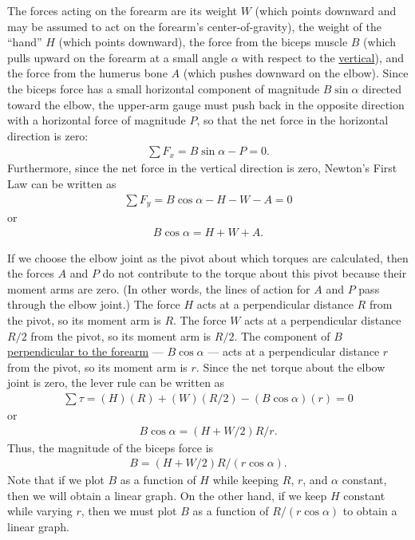 The forces acting on the forearm are its weight \(W\) (which points downward and may be assumed to act on the forearm's center-of-gravity), the weight of the ``hand'' \(H\) (which points downward), the force from the biceps muscle \(B\) (which pulls upward on the forearm at a small angle \(\alpha\) with respect to the \ul{vertical}), and the force from the humerus bone \(A\) (which pushes downward on the elbow).  Since the biceps force has a small horizontal component of magnitude \(B\sin\alpha\) directed toward the elbow, the upper-arm gauge must push back in the opposite direction with a horizontal force of magnitude \(P\), so that the net force in the horizontal direction is zero:
\begin{align} \sum F_x = B \sin \alpha - P = 0.  \end{align}
Furthermore, since the net force in the vertical direction is zero, Newton's First Law can be written as
\begin{align} \sum F_y = B\cos\alpha - H - W - A = 0 \end{align}
or
\begin{align} B\cos\alpha = H + W + A. \label{6Aexp6_eqn_1} \end{align}

If we choose the elbow joint as the pivot about which torques are calculated, then the forces \(A\) and \(P\) do not contribute to the torque about this pivot because their moment arms are zero.  (In other words, the lines of action for \(A\) and \(P\) pass through the elbow joint.)  The force \(H\) acts at a perpendicular distance \(R\) from the pivot, so its moment arm is \(R\).  The force \(W\) acts at a perpendicular distance \(R/2\) from the pivot, so its moment arm is \(R/2\).  The component of \(B\) \ul{perpendicular to the forearm} --- \(B\cos\alpha\) --- acts at a perpendicular distance \(r\) from the pivot, so its moment arm is \(r\).  Since the net torque about the elbow joint is zero, the lever rule can be written as
\begin{align} \sum\tau = (H)(R)  + (W)(R/2) - (B\cos\alpha) (r)  = 0  \end{align}
or
\begin{align} B \cos \alpha = (H + W/2) R/r. \label{6Aexp6_eqn_2} \end{align}
Thus, the magnitude of the biceps force is
\begin{align} B = (H + W/2) R/(r\cos\alpha). \label{6Aexp6_eqn_3} \end{align}
Note that if we plot \(B\) as a function of \(H\) while keeping \(R\), \(r\), and \(\alpha\) constant, then we will obtain a linear graph.  On the other hand, if we keep \(H\) constant while varying \(r\), then we must plot \(B\) as a function of \(R/(r\cos\alpha)\) to obtain a linear graph.

